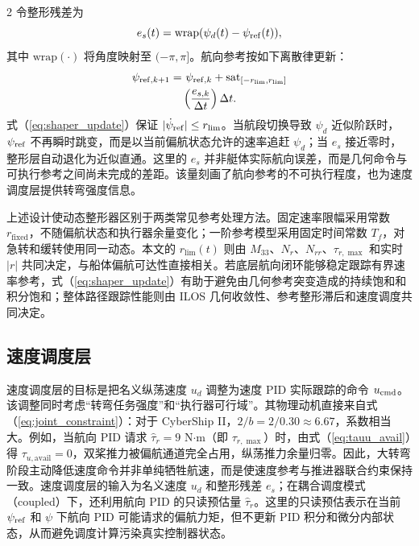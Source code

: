 \documentclass[authordraft]{ctacn}
\begin{document}
\begin{multicols}{2}
令整形残差为
\begin{equation}
e_s(t)=\mathrm{wrap}(\psi_d(t)-\psi_{\rm ref}(t)),
\label{eq:shaping_error}
\end{equation}
其中 $\mathrm{wrap}(\cdot)$ 将角度映射至 $(-\pi,\pi]$。航向参考按如下离散律更新：
\begin{equation}
\begin{aligned}
\psi_{{\rm ref},k+1}=&~\psi_{{\rm ref},k}
+\mathrm{sat}_{[-r_{\lim},r_{\lim}]}\\
&\left(\frac{e_{s,k}}{\Delta t}\right)\Delta t .
\end{aligned}
\label{eq:shaper_update}
\end{equation}
式（\ref{eq:shaper_update}）保证 $|\dot{\psi}_{\rm ref}|\le r_{\lim}$。当航段切换导致 $\psi_d$ 近似阶跃时，$\psi_{\rm ref}$ 不再瞬时跳变，而是以当前偏航状态允许的速率追赶 $\psi_d$；当 $e_s$ 接近零时，整形层自动退化为近似直通。这里的 $e_s$ 并非艇体实际航向误差，而是几何命令与可执行参考之间尚未完成的差距。该量刻画了航向参考的不可执行程度，也为速度调度层提供转弯强度信息。

上述设计使动态整形器区别于两类常见参考处理方法。固定速率限幅采用常数 $r_{\mathrm{fixed}}$，不随偏航状态和执行器余量变化；一阶参考模型采用固定时间常数 $T_f$，对急转和缓转使用同一动态。本文的 $r_{\lim}(t)$ 则由 $M_{33}$、$N_r$、$N_{rr}$、$\tau_{r,\max}$ 和实时 $|r|$ 共同决定，与船体偏航可达性直接相关。若底层航向闭环能够稳定跟踪有界速率参考，式（\ref{eq:shaper_update}）有助于避免由几何参考突变造成的持续饱和和积分饱和；整体路径跟踪性能则由 ILOS 几何收敛性、参考整形滞后和速度调度共同决定。

\subsection{速度调度层}
\label{subsec:speed}

速度调度层的目标是把名义纵荡速度 $u_d$ 调整为速度 PID 实际跟踪的命令 $u_{\rm cmd}$。该调整同时考虑“转弯任务强度”和“执行器可行域”。其物理动机直接来自式（\ref{eq:joint_constraint}）：对于 CyberShip II，$2/b=2/0.30\approx 6.67$，系数相当大。例如，当航向 PID 请求 $\hat\tau_r=9$ N$\cdot$m（即 $\tau_{r,\max}$）时，由式（\ref{eq:tauu_avail}）得 $\tau_{u,\mathrm{avail}}=0$，双桨推力被偏航通道完全占用，纵荡推力余量归零。因此，大转弯阶段主动降低速度命令并非单纯牺牲航速，而是使速度参考与推进器联合约束保持一致。速度调度层的输入为名义速度 $u_d$ 和整形残差 $e_s$；在耦合调度模式（coupled）下，还利用航向 PID 的只读预估量 $\hat{\tau}_r$。这里的只读预估表示在当前 $\psi_{\rm ref}$ 和 $\psi$ 下航向 PID 可能请求的偏航力矩，但不更新 PID 积分和微分内部状态，从而避免调度计算污染真实控制器状态。


\end{multicols}
\end{document}
